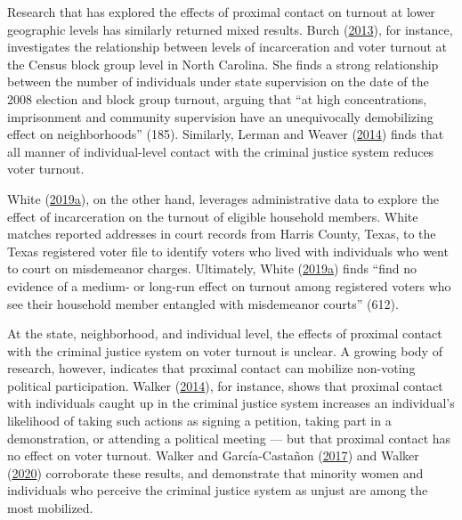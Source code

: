 \documentclass[
  12pt,
]{article}
\begin{document}
Research that has explored the effects of proximal contact on turnout at lower geographic levels has similarly returned mixed results. Burch (\protect\hyperlink{ref-Burch2013}{2013}), for instance, investigates the relationship between levels of incarceration and voter turnout at the Census block group level in North Carolina. She finds a strong relationship between the number of individuals under state supervision on the date of the 2008 election and block group turnout, arguing that ``at high concentrations, imprisonment and community supervision have an unequivocally demobilizing effect on neighborhoods'' (185). Similarly, Lerman and Weaver (\protect\hyperlink{ref-Lerman2014}{2014}) finds that all manner of individual-level contact with the criminal justice system reduces voter turnout.

White (\protect\hyperlink{ref-White2019a}{2019}\protect\hyperlink{ref-White2019a}{a}), on the other hand, leverages administrative data to explore the effect of incarceration on the turnout of eligible household members. White matches reported addresses in court records from Harris County, Texas, to the Texas registered voter file to identify voters who lived with individuals who went to court on misdemeanor charges. Ultimately, White (\protect\hyperlink{ref-White2019a}{2019}\protect\hyperlink{ref-White2019a}{a}) finds ``find no evidence of a medium- or long-run effect on turnout among registered voters who see their household member entangled with misdemeanor courts'' (612).

At the state, neighborhood, and individual level, the effects of proximal contact with the criminal justice system on voter turnout is unclear. A growing body of research, however, indicates that proximal contact can mobilize non-voting political participation. Walker (\protect\hyperlink{ref-Walker2014}{2014}), for instance, shows that proximal contact with individuals caught up in the criminal justice system increases an individual's likelihood of taking such actions as signing a petition, taking part in a demonstration, or attending a political meeting --- but that proximal contact has no effect on voter turnout. Walker and García-Castañon (\protect\hyperlink{ref-Walker2017}{2017}) and Walker (\protect\hyperlink{ref-Walker2020}{2020}) corroborate these results, and demonstrate that minority women and individuals who perceive the criminal justice system as unjust are among the most mobilized.
\end{document}
